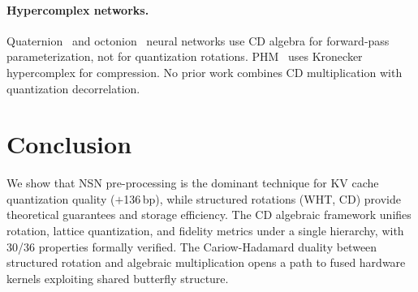 \documentclass[letterpaper,11pt]{article}
\begin{document}
\paragraph{Hypercomplex networks.}
Quaternion~\cite{parcollet2019} and octonion~\cite{zhu2019} neural
networks use CD algebra for forward-pass parameterization, not for
quantization rotations. PHM~\cite{zhang2021} uses Kronecker
hypercomplex for compression. No prior work combines CD multiplication
with quantization decorrelation.

\section{Conclusion}

We show that NSN pre-processing is the dominant technique for KV cache
quantization quality ($+$136\,bp), while structured rotations (WHT, CD)
provide theoretical guarantees and storage efficiency. The CD algebraic
framework unifies rotation, lattice quantization, and fidelity metrics
under a single hierarchy, with 30/36 properties formally verified.
The Cariow-Hadamard duality between structured rotation and
algebraic multiplication opens a path to fused hardware kernels
exploiting shared butterfly structure.
\end{document}
